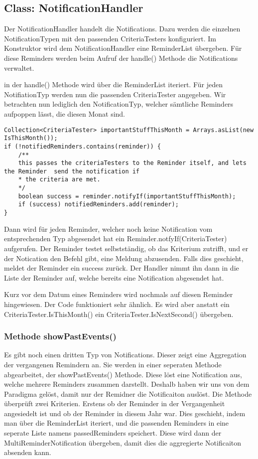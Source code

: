 \subsection{Class: NotificationHandler}
Der NotificationHandler handelt die Notifications. Dazu werden die einzelnen NotificationTypen mit den passenden CriteriaTesters konfiguriert.
Im Konstruktor wird dem NotificationHandler eine ReminderList übergeben. Für diese Reminders werden beim Aufruf der handle() Methode die Notifications verwaltet.


in der handle() Methode wird über die ReminderList iteriert. Für jeden NotifiationTyp werden nun die passenden CriteriaTester angegeben.
Wir betrachten nun lediglich den NotificationTyp, welcher sämtliche Reminders aufpoppen lässt, die diesen Monat sind.

\begin{lstlisting}[caption = NotificationHandler.handle]
Collection<CriteriaTester> importantStuffThisMonth = Arrays.asList(new IsThisMonth());
if (!notifiedReminders.contains(reminder)) {
    /**
    this passes the criteriaTesters to the Reminder itself, and lets the Reminder  send the notification if
    * the criteria are met.
    */
    boolean success = reminder.notifyIf(importantStuffThisMonth);
    if (success) notifiedReminders.add(reminder);
}
\end{lstlisting}
Dann wird für jeden Reminder, welcher noch keine Notification vom entsprechenden Typ abgesendet hat ein Reminder.notfyIf(CriteriaTester) aufgerufen.
Der Reminder testet selbstständig, ob das Kriterium zutrifft, und er der Notication den Befehl gibt, eine Meldung abzusenden. Falls dies geschieht, meldet der Reminder ein
success zurück. Der Handler nimmt ihn dann in die Liste der Reminder auf, welche bereits eine Notification abgesendet hat.

Kurz vor dem Datum eines Reminders wird nochmals auf diesen Reminder hingewiesen.
Der Code funktioniert sehr ähnlich. Es wird aber anstatt ein CriteriaTester.IsThisMonth() ein CriteriaTester.IsNextSecond() übergeben.

\subsubsection{Methode showPastEvents()}

Es gibt noch einen dritten Typ von Notifications. Dieser zeigt eine Aggregation der vergangenen Remindern an. Sie werden in einer seperaten Methode abgearbeitet, der showPastEvents()
Methode. Diese löst eine Notification aus, welche mehrere Reminders zusammen darstellt. Deshalb haben wir uns von dem Paradigma gelöst, damit nur der Remidner die Notificaiton auslöst.
Die Methode überprüft zwei Kriterien. Erstens ob der Reminder in der Vergangenheit angesiedelt ist und ob der Reminder in diesem Jahr war.
Dies geschieht, indem man über die ReminderList iteriert, und die passenden Reminders in eine seperate Liste namens passedReminders speichert.
Diese wird dann der MultiReminderNotification übergeben, damit dies die aggregierte Notificaiton absenden kann.

